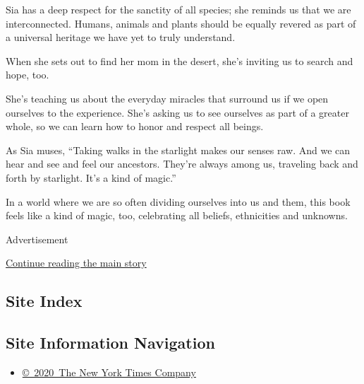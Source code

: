 Sia has a deep respect for the sanctity of all species; she reminds us
that we are interconnected. Humans, animals and plants should be equally
revered as part of a universal heritage we have yet to truly understand.

When she sets out to find her mom in the desert, she's inviting us to
search and hope, too.

She's teaching us about the everyday miracles that surround us if we
open ourselves to the experience. She's asking us to see ourselves as
part of a greater whole, so we can learn how to honor and respect all
beings.

As Sia muses, ``Taking walks in the starlight makes our senses raw. And
we can hear and see and feel our ancestors. They're always among us,
traveling back and forth by starlight. It's a kind of magic.''

In a world where we are so often dividing ourselves into us and them,
this book feels like a kind of magic, too, celebrating all beliefs,
ethnicities and unknowns.

Advertisement

\protect\hyperlink{after-bottom}{Continue reading the main story}

\hypertarget{site-index}{%
\subsection{Site Index}\label{site-index}}

\hypertarget{site-information-navigation}{%
\subsection{Site Information
Navigation}\label{site-information-navigation}}

\begin{itemize}
\tightlist
\item
  \href{https://help.nytimes.com/hc/en-us/articles/115014792127-Copyright-notice}{©~2020~The
  New York Times Company}
\end{itemize}


